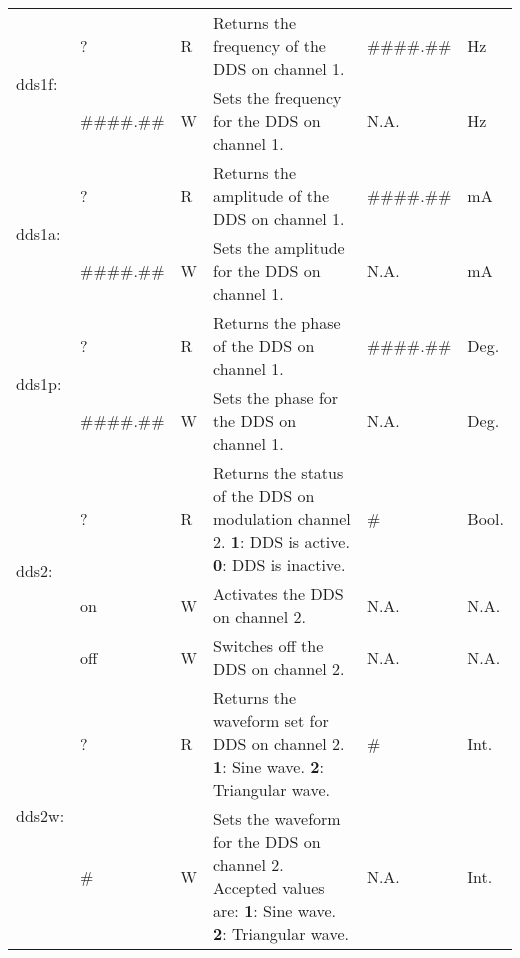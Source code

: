 \begin{center}
\begin{longtable}{| m{} | m{} | m{} | m{} | m{}| m{} |}
    \multirow{2}{0.1\textwidth}{dds1f:}  & ? & R & Returns the frequency of the DDS on channel 1. &  \#\#\#\#.\#\# & Hz \\
                                        \cline{2-6}
                                        &  \#\#\#\#.\#\#  & W & Sets the frequency for the DDS on channel 1. & N.A. & Hz\\
    \hline
    
    \multirow{2}{0.1\textwidth}{dds1a:}  & ? & R & Returns the amplitude of the DDS on channel 1. &  \#\#\#\#.\#\# & mA \\
                                        \cline{2-6}
                                        &  \#\#\#\#.\#\#  & W & Sets the amplitude for the DDS on channel 1. & N.A. & mA\\
    \hline
    
    \multirow{2}{0.1\textwidth}{dds1p:}  & ? & R & Returns the phase of the DDS on channel 1. &  \#\#\#\#.\#\# & Deg. \\
                                        \cline{2-6}
                                        &  \#\#\#\#.\#\#  & W & Sets the phase for the DDS on channel 1. & N.A. & Deg. \\
    \hline
    
    \multirow{3}{0.1\textwidth}{dds2:}  & ? & R & Returns the status of the DDS on modulation channel 2.
                                            \newline \textbf{1}: DDS is active.
                                            \newline \textbf{0}: DDS is inactive. &  \# & Bool. \\
                                        \cline{2-6}
                                        &  on  & W & Activates the DDS on channel 2. & N.A. & N.A.\\
                                        \cline{2-6}
                                        &  off  & W & Switches off the DDS on channel 2. & N.A. & N.A.\\
    \hline
    
    \multirow{2}{0.1\textwidth}{dds2w:}  & ? & R & Returns the waveform set for DDS on channel 2.
                                            \newline \textbf{1}: Sine wave.
                                            \newline \textbf{2}: Triangular wave.  &  \# & Int. \\
                                        \cline{2-6}
                                        &  \#  & W & Sets the waveform for the DDS on channel 2. Accepted values are:
                                            \newline \textbf{1}: Sine wave.
                                            \newline \textbf{2}: Triangular wave. & N.A. & Int.\\
    \hline
    

\end{longtable}
\end{center}
